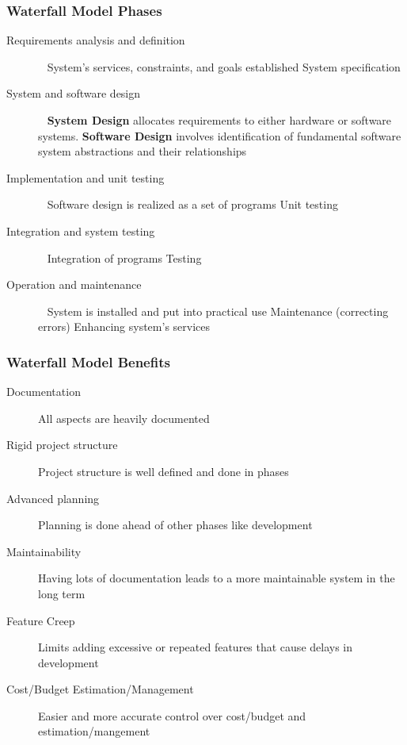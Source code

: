 \documentclass{report}
\begin{document}
\subsubsection{Waterfall Model Phases} 
\begin{description}
  \item [Requirements analysis and definition] \ \newline
  System’s services, constraints, and goals established \newline
  System specification
  \item [System and software design] \ \newline
  \textbf{System Design} allocates requirements to either hardware or software systems. \newline
  \textbf{Software Design} involves identification of fundamental software system abstractions and their relationships
  \item [Implementation and unit testing] \ \newline
  Software design is realized as a set of programs \newline
  Unit testing
  \item [Integration and system testing] \ \newline
  Integration of programs \newline
  Testing
  \item [Operation and maintenance] \ \newline
  System is installed and put into practical use \newline
  Maintenance (correcting errors) \newline
  Enhancing system’s services
\end{description}

\subsubsection{Waterfall Model Benefits}
\begin{description}
  \item [Documentation] All aspects are heavily documented
  \item [Rigid project structure] Project structure is well defined and done in phases
  \item [Advanced planning] Planning is done ahead of other phases like development
  \item [Maintainability] Having lots of documentation leads to a more maintainable system in the long term
  \item [Feature Creep] Limits adding excessive or repeated features that cause delays in development
  \item [Cost/Budget Estimation/Management] Easier and more accurate control over cost/budget and estimation/mangement
\end{description}
\end{document}
